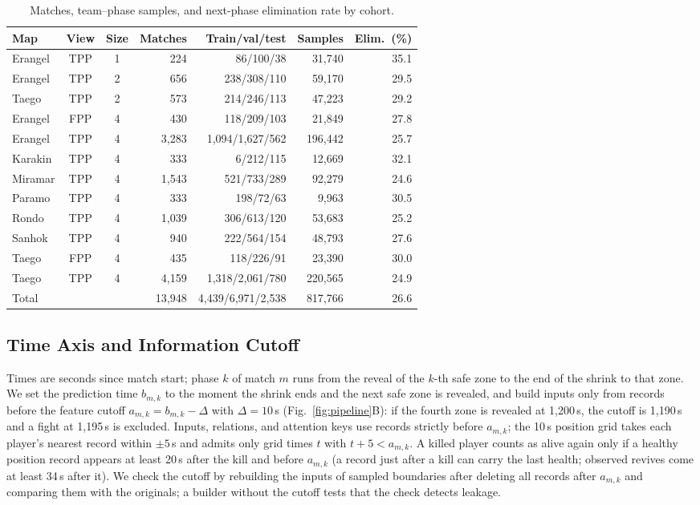\documentclass[sigconf,anonymous,nonacm]{acmart}
\begin{document}
\begin{table}[t]
\centering
\caption{Matches, team--phase samples, and next-phase elimination rate by cohort.}
\label{tab:cohorts}
\footnotesize
\setlength{\tabcolsep}{2.7pt}
\begin{tabular}{lccrrrr}
\hline
Map & View & Size & Matches & Train/val/test & Samples & Elim.\ (\%) \\
\hline
Erangel & TPP & 1 & 224 & 86/100/38 & 31,740 & 35.1 \\
Erangel & TPP & 2 & 656 & 238/308/110 & 59,170 & 29.5 \\
Taego & TPP & 2 & 573 & 214/246/113 & 47,223 & 29.2 \\
Erangel & FPP & 4 & 430 & 118/209/103 & 21,849 & 27.8 \\
Erangel & TPP & 4 & 3,283 & 1,094/1,627/562 & 196,442 & 25.7 \\
Karakin & TPP & 4 & 333 & 6/212/115 & 12,669 & 32.1 \\
Miramar & TPP & 4 & 1,543 & 521/733/289 & 92,279 & 24.6 \\
Paramo & TPP & 4 & 333 & 198/72/63 & 9,963 & 30.5 \\
Rondo & TPP & 4 & 1,039 & 306/613/120 & 53,683 & 25.2 \\
Sanhok & TPP & 4 & 940 & 222/564/154 & 48,793 & 27.6 \\
Taego & FPP & 4 & 435 & 118/226/91 & 23,390 & 30.0 \\
Taego & TPP & 4 & 4,159 & 1,318/2,061/780 & 220,565 & 24.9 \\
\hline
Total & & & 13,948 & 4,439/6,971/2,538 & 817,766 & 26.6 \\
\hline
\end{tabular}
\end{table}

\subsection{Time Axis and Information Cutoff}
\label{sec:method:samples}
Times are seconds since match start; phase $k$ of match $m$ runs from the reveal of the $k$-th safe zone to the end of the shrink to that zone.
We set the prediction time $b_{m,k}$ to the moment the shrink ends and the next safe zone is revealed, and build inputs only from records before the feature cutoff $a_{m,k}=b_{m,k}-\Delta$ with $\Delta=10$\,s (Fig.~\ref{fig:pipeline}B): if the fourth zone is revealed at 1,200\,s, the cutoff is 1,190\,s and a fight at 1,195\,s is excluded. Inputs, relations, and attention keys use records strictly before $a_{m,k}$; the 10\,s position grid takes each player's nearest record within $\pm5$\,s and admits only grid times $t$ with $t+5<a_{m,k}$.
A killed player counts as alive again only if a healthy position record appears at least 20\,s after the kill and before $a_{m,k}$ (a record just after a kill can carry the last health; observed revives come at least 34\,s after it).
We check the cutoff by rebuilding the inputs of sampled boundaries after deleting all records after $a_{m,k}$ and comparing them with the originals; a builder without the cutoff tests that the check detects leakage.
\end{document}
